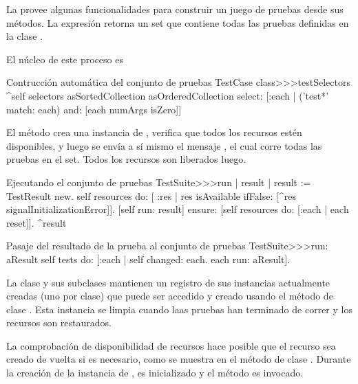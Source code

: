 \documentclass[a4paper,10pt,twoside]{book}
\begin{document}
La  provee algunas funcionalidades para construir un juego de pruebas desde sus m\'etodos.
La expresi\'on  retorna un set que contiene todas las 
pruebas definidas en la clase  .

El n\'ucleo de este proceso es
\begin{method}[testcasetestselectors]{Contrucci\'on autom\'atica del conjunto de pruebas}
TestCase class>>>testSelectors 
	^self selectors asSortedCollection asOrderedCollection select: [:each | 
		('test*' match: each) and: [each numArgs isZero]]
\end{method}

El m\'etodo  crea una instancia de , verifica que todos los
recursos est\'en disponibles, y luego se env\'ia a s\'i mismo el mensaje , 
el cual corre todas las pruebas en el set. Todos los recursos son liberados luego.

\begin{method}[testsuiterun]{Ejecutando el conjunto de pruebas}
TestSuite>>>run
	| result |
 	result := TestResult new.
	self resources do: [ :res |
		res isAvailable ifFalse: [^res signalInitializationError]].
	[self run: result] ensure: [self resources do: [:each | each reset]].
	^result
\end{method}

\begin{method}[testsuiterun:]{Pasaje del resultado de la prueba al conjunto de pruebas}
TestSuite>>>run: aResult
	self tests do: [:each | 
		self changed: each.
		each run: aResult].
\end{method}


La clase  y sus subclases mantienen un registro de sus instancias
actualmente creadas (uno por clase) que puede ser accedido y creado usando el m\'etodo de clase
. Esta instancia se limpia cuando laas pruebas
han terminado de correr y los recursos son restaurados.

La comprobaci\'on de disponibilidad de recursos hace posible que el recurso sea creado de vuelta si es necesario,
como se muestra en el m\'etodo de clase . Durante la
creaci\'on de la instancia de  , es inicializado y el m\'etodo  
es invocado.


\end{document}

